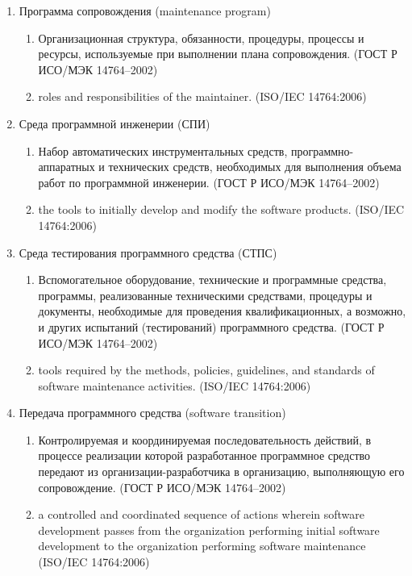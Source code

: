 \begin{enumerate}
    \item Программа сопровождения (maintenance program)
    \begin{enumerate}
        \item Организационная структура, обязанности, процедуры, процессы и ресурсы, используемые при выполнении плана сопровождения.
        (ГОСТ Р ИСО/МЭК 14764--2002)
        \item roles and responsibilities of the maintainer.
        (ISO/IEC 14764:2006)
    \end{enumerate}

    \item Среда программной инженерии (СПИ)
    \begin{enumerate}
        \item Набор автоматических инструментальных средств, программно-аппаратных и технических средств, необходимых для выполнения объема работ по программной инженерии.
        (ГОСТ Р ИСО/МЭК 14764--2002)
        \item the tools to initially develop and modify the software products.
        (ISO/IEC 14764:2006)
    \end{enumerate}

    \item Среда тестирования программного средства (СТПС)
    \begin{enumerate}
        \item Вспомогательное оборудование, технические и программные средства, программы, реализованные техническими средствами, процедуры и документы, необходимые для проведения квалификационных, а возможно, и других испытаний (тестирований) программного средства.
        (ГОСТ Р ИСО/МЭК 14764--2002)
        \item tools required by the methods, policies, guidelines, and standards of software maintenance activities.
        (ISO/IEC 14764:2006)
    \end{enumerate}

    \item Передача программного средства (software transition)
    \begin{enumerate}
        \item Контролируемая и координируемая последовательность действий, в процессе реализации которой разработанное программное средство передают из организации-разработчика в организацию, выполняющую его сопровождение.
        (ГОСТ Р ИСО/МЭК 14764--2002)
        \item a controlled and coordinated sequence of actions wherein software development passes from the organization performing initial software development to the organization performing software maintenance
        (ISO/IEC 14764:2006)
    \end{enumerate}
\end{enumerate}